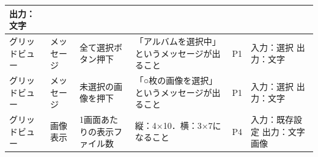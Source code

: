 \begin{table}[htbp]
\begin{tabular}{|p{8em}|p{7em}|p{9em}|p{9em}|p{3em}|p{12em}|}
出力：文字 \bigstrut\\
    \hline
    グリッドビュー & メッセージ & 全て選択ボタン押下 & 「アルバムを選択中」というメッセージが出ること & P1    & 入力：選択
出力：文字 \bigstrut\\
    \hline
    グリッドビュー & メッセージ & 未選択の画像を押下 & 「○枚の画像を選択」というメッセージが出ること & P1    & 入力：選択
出力：文字 \bigstrut\\
    \hline
    グリッドビュー & 画像表示  & 1画面あたりの表示ファイル数 & 縦：4×10．横：3×7になること & P4    & 入力：既存設定
出力：文字　画像 \bigstrut\\
    \hline
    \end{tabular}%
  \label{tab:D-4-ER-2}%
\end{table}%

